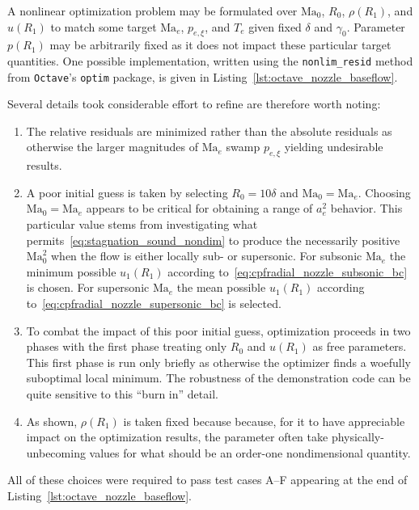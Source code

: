 \documentclass[letterpaper,11pt,nointlimits,reqno]{amsart}
\makeatletter
\newcommand{\Mach}[1][]{\mbox{Ma}_{#1}}
\newcommand\mynobreakpar{\par\nobreak\@afterheading}
\makeatother
\begin{document}
A nonlinear optimization problem may be formulated over $\Mach[0]$, $R_0$,
$\rho\!\left(R_1\right)$, and $u\!\left(R_1\right)$ to match some target
$\Mach[e]{}$, $p_{e,\xi}$, and $T_e$ given fixed $\delta$ and $\gamma_0$.
Parameter $p\!\left(R_1\right)$ may be arbitrarily fixed as it does not impact
these particular target quantities.  One possible implementation, written using
the \texttt{nonlim\_resid} method from \texttt{Octave}'s \texttt{optim}
package, is given in Listing~\ref{lst:octave_nozzle_baseflow}.

Several details took considerable effort to refine are therefore worth
noting:\mynobreakpar
\begin{enumerate}
  \item The relative residuals are minimized rather than the absolute residuals
    as otherwise the larger magnitudes of $\Mach[e]{}$ swamp $p_{e,\xi}$
    yielding undesirable results.
  \item A poor initial guess is taken by selecting $R_0 = 10\delta$ and
    $\Mach[0]{}=\Mach[e]{}$.  Choosing $\Mach[0]{}=\Mach[e]{}$ appears to be
    critical for obtaining a range of $a_e^2$ behavior.  This particular value
    stems from investigating what permits~\eqref{eq:stagnation_sound_nondim} to
    produce the necessarily positive $\Mach[0]^2$ when the flow is either
    locally sub- or supersonic.  For subsonic $\Mach[e]{}$ the minimum possible
    $u_1\!\left(R_1\right)$ according
    to~\eqref{eq:cpfradial_nozzle_subsonic_bc} is chosen.  For supersonic
    $\Mach[e]{}$ the mean possible $u_1\!\left(R_1\right)$ according
    to~\eqref{eq:cpfradial_nozzle_supersonic_bc} is selected.
  \item To combat the impact of this poor initial guess, optimization proceeds
    in two phases with the first phase treating only $R_0$ and
    $u\!\left(R_1\right)$ as free parameters.  This first phase is run only
    briefly as otherwise the optimizer finds a woefully suboptimal local
    minimum.  The robustness of the demonstration code can be quite sensitive
    to this ``burn in'' detail.
  \item As shown, $\rho\!\left(R_1\right)$ is taken fixed because because, for
    it to have appreciable impact on the optimization results, the parameter
    often take physically-unbecoming values for what should be an order-one
    nondimensional quantity.
\end{enumerate}
All of these choices were required to pass test cases A--F appearing at the end
of Listing~\ref{lst:octave_nozzle_baseflow}.
\end{document}
